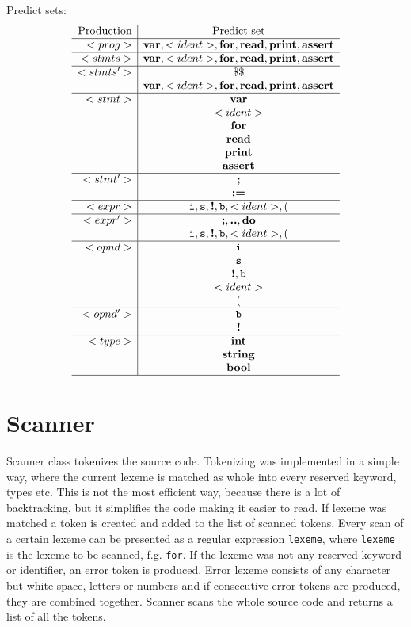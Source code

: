 \documentclass[a4paper,12pt]{article}
\newcommand{\bb}[1]{\textbf{#1}}
\newcommand{\ttt}[1]{\texttt{#1}}
\newcommand{\integer}{\ttt{i}}
\newcommand{\str}{\ttt{s}}
\newcommand{\bool}{\ttt{b}}
\begin{document}
Predict sets:
\[
\begin{array}{r|c}
\text{Production} & \text{Predict set} \\
\hline
<prog>   & \bb{var}, <ident>, \bb{for}, \bb{read}, \bb{print}, \bb{assert} \\
\hline
<stmts>  & \bb{var}, <ident>, \bb{for}, \bb{read}, \bb{print}, \bb{assert} \\
\hline
<stmts'> & \$\$ \\
         & \bb{var}, <ident>, \bb{for}, \bb{read}, \bb{print}, \bb{assert} \\
\hline
<stmt>   & \bb{var}  \\
         & <ident>  \\
         & \bb{for}  \\
         & \bb{read}  \\
         & \bb{print}  \\
         & \bb{assert}  \\
\hline
<stmt'>  & \bb{;} \\
         & \bb{:=}  \\
\hline
<expr>   & \integer, \str, \bb{!}, \bool, <ident>, ( \\
\hline
<expr'>  & \bb{;}, \bb{..}, \bb{do} \\
         & \integer, \str, \bb{!}, \bool, <ident>, ( \\ 
\hline
<opnd>   & \integer  \\
         & \str  \\
         & \bb{!}, \bool  \\
         & <ident>  \\
         & (  \\
\hline
<opnd'>  & \bool \\
         & \bb{!}  \\
\hline
<type>   & \bb{int} \\
         & \bb{string} \\
         & \bb{bool} \\
\hline
\end{array}
\]

\section{Scanner}
Scanner class tokenizes the source code. Tokenizing was implemented in a simple
way, where the current lexeme is matched as whole into every reserved keyword,
types etc. This is not the most efficient way, because there is a lot of
backtracking, but it simplifies the code making it easier to read. If lexeme was
matched a token is created and added to the list of scanned tokens. Every scan
of a certain lexeme can be presented as a regular expression \ttt{lexeme}, where
\ttt{lexeme} is the lexeme to be scanned, f.g. \ttt{for}. If the lexeme was not
any reserved keyword or identifier, an error token is produced. Error lexeme consists of any
character but white space, letters or numbers and if consecutive error tokens
are produced, they are combined together. Scanner scans the whole source code
and returns a list of all the tokens.
\end{document}
